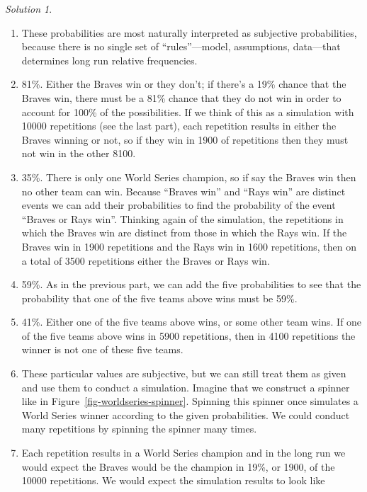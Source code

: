 \documentclass[
  letterpaper,
  DIV=11,
  numbers=noendperiod]{scrreprt}
\theoremstyle{plain}
\theoremstyle{definition}
\theoremstyle{definition}
\theoremstyle{definition}
\theoremstyle{remark}
\newtheorem{refsolution}{Solution}[chapter]
\begin{document}
\begin{tcolorbox}[enhanced jigsaw, opacityback=0, rightrule=.15mm, coltitle=black, colframe=quarto-callout-tip-color-frame, toprule=.15mm, colbacktitle=quarto-callout-tip-color!10!white, opacitybacktitle=0.6, left=2mm, toptitle=1mm, breakable, title={Solution (click to expand)}, bottomtitle=1mm, colback=white, leftrule=.75mm, titlerule=0mm, arc=.35mm, bottomrule=.15mm]

\begin{refsolution}
\leavevmode

\begin{enumerate}
\def\labelenumi{\arabic{enumi}.}
\item
  These probabilities are most naturally interpreted as subjective
  probabilities, because there is no single set of ``rules''---model,
  assumptions, data---that determines long run relative frequencies.
\item
  81\%. Either the Braves win or they don't; if there's a 19\% chance
  that the Braves win, there must be a 81\% chance that they do not win
  in order to account for 100\% of the possibilities. If we think of
  this as a simulation with 10000 repetitions (see the last part), each
  repetition results in either the Braves winning or not, so if they win
  in 1900 of repetitions then they must not win in the other 8100.
\item
  35\%. There is only one World Series champion, so if say the Braves
  win then no other team can win. Because ``Braves win'' and ``Rays
  win'' are distinct events we can add their probabilities to find the
  probability of the event ``Braves or Rays win''. Thinking again of the
  simulation, the repetitions in which the Braves win are distinct from
  those in which the Rays win. If the Braves win in 1900 repetitions and
  the Rays win in 1600 repetitions, then on a total of 3500 repetitions
  either the Braves or Rays win.
\item
  59\%. As in the previous part, we can add the five probabilities to
  see that the probability that one of the five teams above wins must be
  59\%.
\item
  41\%. Either one of the five teams above wins, or some other team
  wins. If one of the five teams above wins in 5900 repetitions, then in
  4100 repetitions the winner is not one of these five teams.
\item
  These particular values are subjective, but we can still treat them as
  given and use them to conduct a simulation. Imagine that we construct
  a spinner\footnotemark{} like in Figure~\ref{fig-worldseries-spinner}.
  Spinning this spinner once simulates a World Series winner according
  to the given probabilities. We could conduct many repetitions by
  spinning the spinner many times.
\item
  Each repetition results in a World Series champion and in the long run
  we would expect the Braves would be the champion in 19\%, or 1900, of
  the 10000 repetitions. We would expect the simulation results to look
  like


\end{enumerate}
\end{refsolution}
\end{tcolorbox}
\end{document}

